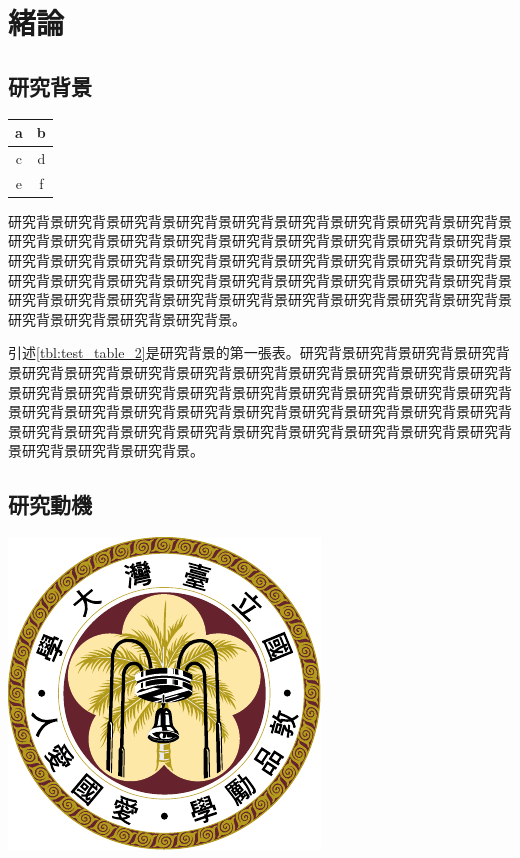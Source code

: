 
\chapter{緒論}

\section{研究背景}

\begingroup
\centering
\begin{tabular}{|c|c|}
  \hline
  a & b \\\hline
  c & d \\\hline
  e & f \\\hline
  \hline
\end{tabular}
\captionsetup{type=table}
\label{tbl:test_table_2}

\endgroup

研究背景研究背景研究背景研究背景研究背景研究背景研究背景研究背景研究背景研究背景研究背景研究背景研究背景研究背景研究背景研究背景研究背景研究背景研究背景研究背景研究背景研究背景研究背景研究背景研究背景研究背景研究背景研究背景研究背景研究背景研究背景研究背景研究背景研究背景研究背景研究背景研究背景研究背景研究背景研究背景研究背景研究背景研究背景研究背景研究背景研究背景研究背景研究背景研究背景。\par

引述\ref{tbl:test_table_2}是研究背景的第一張表。研究背景研究背景研究背景研究背景研究背景研究背景研究背景研究背景研究背景研究背景研究背景研究背景研究背景研究背景研究背景研究背景研究背景研究背景研究背景研究背景研究背景研究背景研究背景研究背景研究背景研究背景研究背景研究背景研究背景研究背景研究背景研究背景研究背景研究背景研究背景研究背景研究背景研究背景研究背景研究背景研究背景研究背景研究背景。

\section{研究動機}
\begingroup
\centering
\includegraphics{figures/seal.pdf}
\captionsetup{type=figure}
\label{fig:test_fig_1}
\endgroup

